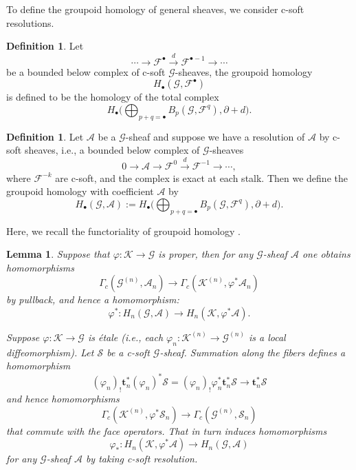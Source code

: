 \documentclass[a4paper]{amsart}
\newcommand{\DR}{\operatorname{DR}}
\newcommand{\RR}{\mathbb R}
\newcommand{\maA}{\mathcal A}
\newcommand{\maE}{\mathcal E}
\newcommand{\maF}{\mathcal F}
\newcommand{\maG}{\mathcal G}
\newcommand{\maK}{\mathcal K}
\newcommand{\maS}{\mathcal S}
\newcommand{\bt}{\mathbf{t}}
\newcommand\<{\langle}
\renewcommand\>{\rangle}
\newtheorem{lem}[theorem]{Lemma}
\theoremstyle{definition}
\newtheorem{dfn}[theorem]{Definition}
\theoremstyle{remark}
\begin{document}
To define the groupoid homology of general sheaves, we consider c-soft resolutions.

\begin{dfn}
\label{ChainCyclic}
Let
$$ \cdots \to \maF ^\bullet \xrightarrow{d} \maF ^{\bullet - 1} \to \cdots $$
be a bounded below complex of c-soft $\maG$-sheaves, the groupoid homology
$$ H _\bullet (\maG, \maF ^\bullet )$$
is defined to be the homology of the total complex
$$ H _\bullet \Big(\bigoplus _{p+q=\bullet} B_p (\maG , \maF ^q), \partial + d \Big) .$$
\end{dfn}

\begin{dfn}
Let $\maA$ be a $\maG$-sheaf and suppose we have a resolution of $\maA$ by c-soft sheaves,
i.e., a bounded below complex of $\maG$-sheaves
$$ 0 \to \maA \to \maF ^0 \xrightarrow{d} \maF ^{-1} \to \cdots, $$
where $\maF ^{-k}$ are c-soft, and the complex is exact at each stalk.
Then we define the groupoid homology with coefficient $\maA$ by
$$ H _\bullet (\maG, \maA) := H _\bullet \Big(\bigoplus _{p+q=\bullet} B_p (\maG , \maF ^q), \partial + d \Big) .$$
\end{dfn}
%

Here, we recall the functoriality of groupoid homology \cite[Section 3.7]{Moerdijk;EtaleHomology}.
\begin{lem}
\label{HomFunct}
Suppose that $\varphi : \maK \to \maG$ is proper, then for any $\maG$-sheaf $\maA$ one obtains homomorphisms
$$ \Gamma_c (\maG ^{(n)} , \maA _n) \to \Gamma_c (\maK ^{(n)} , \varphi ^* \maA _n) $$
by pullback, and hence a homomorphism:
$$ \varphi ^* : H _n (\maG , \maA) \to H_n (\maK , \varphi^* \maA) .$$

Suppose $\varphi : \maK \to \maG$ is \'etale (i.e., each $\varphi _n : \maK ^{(n)} \to \maG ^{(n)}$ is a local diffeomorphism).
Let $\maS$ be a c-soft $\maG$-sheaf.
Summation along the fibers defines a homomorphism
$$(\varphi _n )_! \bt _n^* (\varphi _n)^* \maS = (\varphi _n)_! \varphi _n^* \bt _n ^* \maS \to \bt _n ^* \maS $$
and hence homomorphisms
$$ \Gamma_c (\maK ^{(n)} , \varphi ^* \maS _n) \to \Gamma_c (\maG ^{(n)} , \maS _n) $$
that commute with the face operators. That in turn induces homomorphisms
$$ \varphi _* : H_n (\maK , \varphi^* \maA) \to H_n (\maG , \maA) $$
for any $\maG$-sheaf $\maA$ by taking c-soft resolution.
\end{lem}
\end{document}
